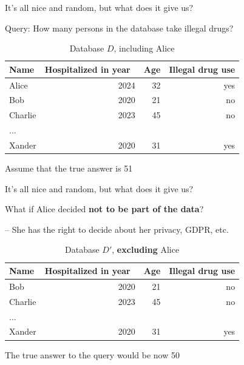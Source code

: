 \documentclass[12pt,aspectratio=169,handout]{beamer}
\begin{document}
\begin{frame}{It's all nice and random, but what does it give us?}

Query: How many persons in the database take illegal drugs?

\begin{table}
\footnotesize
\begin{tabular}{lrrr} \toprule
Name & Hospitalized in year & Age & Illegal drug use \\ \midrule
Alice & 2024 & 32 & yes \\
Bob & 2020 & 21 & no \\
Charlie & 2023 & 45 & no \\
$\ldots$ & & & \\
Xander & 2020 & 31 & yes \\ \bottomrule
\end{tabular}
\caption{Database $D$, including Alice}
\end{table}


Assume that the true answer is 51

\end{frame}


\begin{frame}{It's all nice and random, but what does it give us?}

What if Alice decided \textbf{not to be part of the data}?

-- She has the right to decide about her privacy, GDPR, etc.

\begin{table}
\footnotesize
\begin{tabular}{lrrr} \toprule
Name & Hospitalized in year & Age & Illegal drug use \\ \midrule
Bob & 2020 & 21 & no \\
Charlie & 2023 & 45 & no \\
$\ldots$ & & & \\
Xander & 2020 & 31 & yes \\ \bottomrule
\end{tabular}
\caption{Database $D'$, \textbf{excluding} Alice}
\end{table}

The true answer to the query would be now 50


\end{frame}
\end{document}
